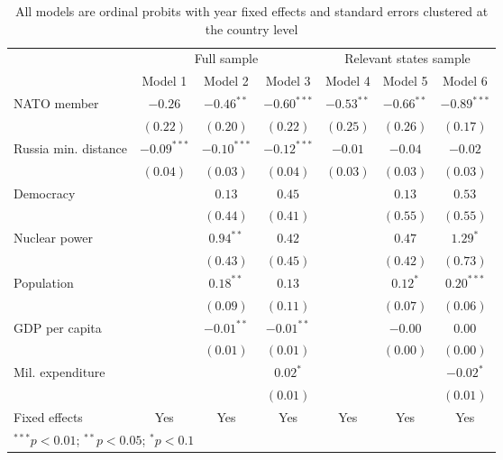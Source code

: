 
\begin{table}[h]
\begin{center}
\begin{tabular}{l c c c c c c}
\hline
 & \multicolumn{3}{c}{Full sample} & \multicolumn{3}{c}{Relevant states sample} \\
\cline{2-4} \cline{5-7}
 & Model 1 & Model 2 & Model 3 & Model 4 & Model 5 & Model 6 \\
\hline
NATO member          & $-0.26$       & $-0.46^{**}$  & $-0.60^{***}$ & $-0.53^{**}$ & $-0.66^{**}$ & $-0.89^{***}$ \\
                     & $(0.22)$      & $(0.20)$      & $(0.22)$      & $(0.25)$     & $(0.26)$     & $(0.17)$      \\
Russia min. distance & $-0.09^{***}$ & $-0.10^{***}$ & $-0.12^{***}$ & $-0.01$      & $-0.04$      & $-0.02$       \\
                     & $(0.04)$      & $(0.03)$      & $(0.04)$      & $(0.03)$     & $(0.03)$     & $(0.03)$      \\
Democracy            &               & $0.13$        & $0.45$        &              & $0.13$       & $0.53$        \\
                     &               & $(0.44)$      & $(0.41)$      &              & $(0.55)$     & $(0.55)$      \\
Nuclear power        &               & $0.94^{**}$   & $0.42$        &              & $0.47$       & $1.29^{*}$    \\
                     &               & $(0.43)$      & $(0.45)$      &              & $(0.42)$     & $(0.73)$      \\
Population           &               & $0.18^{**}$   & $0.13$        &              & $0.12^{*}$   & $0.20^{***}$  \\
                     &               & $(0.09)$      & $(0.11)$      &              & $(0.07)$     & $(0.06)$      \\
GDP per capita       &               & $-0.01^{**}$  & $-0.01^{**}$  &              & $-0.00$      & $0.00$        \\
                     &               & $(0.01)$      & $(0.01)$      &              & $(0.00)$     & $(0.00)$      \\
Mil. expenditure     &               &               & $0.02^{*}$    &              &              & $-0.02^{*}$   \\
                     &               &               & $(0.01)$      &              &              & $(0.01)$      \\
\hline
Fixed effects        & Yes           & Yes           & Yes           & Yes          & Yes          & Yes           \\
\hline
\multicolumn{7}{l}{\scriptsize{$^{***}p<0.01$; $^{**}p<0.05$; $^{*}p<0.1$}}
\end{tabular}
\caption{All models are ordinal probits with year fixed effects and standard errors clustered at the country level}
\label{table:model}
\end{center}
\end{table}
